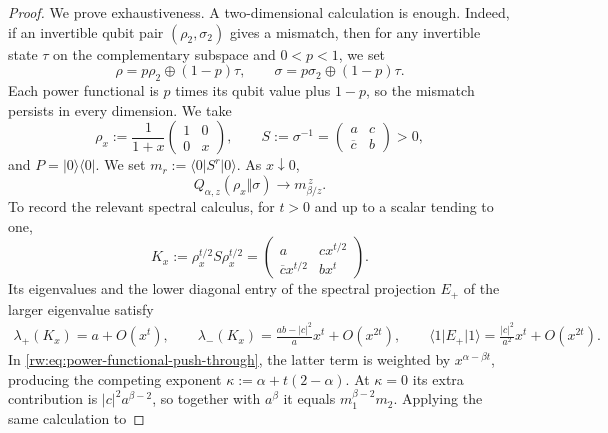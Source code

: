 \documentclass[11pt]{article}
\theoremstyle{remark}
\newcommand{\1}{\mathbbm{1}}
\begin{document}
\begin{proof}
We prove exhaustiveness.  A two-dimensional calculation is enough.
Indeed, if an invertible qubit pair $(\rho_2,\sigma_2)$ gives a mismatch,
then for any invertible state $\tau$ on the complementary subspace and
$0<p<1$, we set
\begin{equation}
 \rho=p\rho_2\oplus(1-p)\tau,
 \qquad
 \sigma=p\sigma_2\oplus(1-p)\tau.
 \label{rw:eq:real-t-qubit-embedding}
\end{equation}
Each power functional is $p$ times its qubit value plus $1-p$, so
the mismatch persists in every dimension.  We take
\begin{equation}
 \rho_x:=\frac{1}{1+x}
 \begin{pmatrix}1&0\\0&x\end{pmatrix},
 \qquad
 S:=\sigma^{-1}
 =\begin{pmatrix}a&c\\ \overline c&b\end{pmatrix}>0,
 \label{rw:eq:real-t-rank-one-witness}
\end{equation}
and $P=\lvert0\rangle\!\langle0\rvert$.  We set
$m_r:=\langle0\rvert S^r\lvert0\rangle$.  As $x\downarrow0$,
\begin{equation}
 Q_{\alpha,z}(\rho_x\Vert\sigma)
 \longrightarrow m_{\beta/z}^{\,z}.
 \label{rw:eq:real-t-alpha-z-pure-limit}
\end{equation}
To record the relevant spectral calculus, for $t>0$ and up to a
scalar tending to one,
\begin{equation}
 K_x:=\rho_x^{t/2}S\rho_x^{t/2}
 =\begin{pmatrix}
   a&cx^{t/2}\\ \overline c x^{t/2}&bx^t
  \end{pmatrix}.
 \label{rw:eq:real-t-spectral-block}
\end{equation}
Its eigenvalues and the lower diagonal entry of the spectral
projection $E_+$ of the larger eigenvalue satisfy
\begin{align}
 \lambda_+(K_x)=a+O(x^t), \qquad
 \lambda_-(K_x)=\frac{ab-\lvert c\rvert^2}{a}x^t+O(x^{2t}), \qquad
 \langle1\rvert E_+\lvert1\rangle
 =\frac{\lvert c\rvert^2}{a^2}x^t+O(x^{2t}).
 \label{rw:eq:real-t-spectral-asymptotics}
\end{align}
In \eqref{rw:eq:power-functional-push-through}, the latter term is
weighted by $x^{\alpha-\beta t}$, producing the competing exponent
$\kappa:=\alpha+t(2-\alpha)$.  At $\kappa=0$ its extra contribution
is $\lvert c\rvert^2a^{\beta-2}$, so together with $a^\beta$ it
equals $m_1^{\beta-2}m_2$.  Applying the same calculation to

\end{proof}
\end{document}
